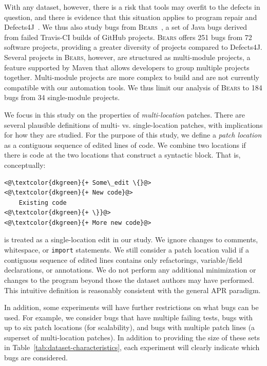 \documentclass[10pt,journal,compsoc]{IEEEtran}
\newcommand\bears{\textsc{Bears}\xspace}
\begin{document}
With any dataset, however, there is a risk that tools may overfit
to the defects in question, and there is evidence that this situation applies to
program repair and Defects4J~\cite{durieux-repair-them-all}. 
We thus also study bugs from \bears~\cite{bears}, 
a set of Java bugs derived from failed Travis-CI builds of GitHub projects. 
\bears offers 251 bugs from 72 software projects, providing a greater diversity of 
projects compared to Defects4J. 
Several projects in \bears, however, are structured as multi-module projects, a feature 
supported by Maven that allows developers to group multiple projects together. Multi-module 
projects are more complex to build and are not currently compatible with our automation tools.
We thus limit our analysis of \bears to 184 bugs from 34 single-module projects.

We focus in this study on the properties of \emph{multi-location} patches. There are
several plausible definitions of multi- vs. single-location patches, with
implications for how they are studied. For the purpose of this study, we define
a \emph{patch location} as a contiguous sequence of edited lines of code.  We
combine two locations if there is code at the two locations that construct a syntactic 
block. That is, conceptually:
\begin{lstlisting}[style=examplestyle]
<@\textcolor{dkgreen}{+ Some\_edit \{}@>
<@\textcolor{dkgreen}{+ New code}@>
    Existing code
<@\textcolor{dkgreen}{+ \}}@>
<@\textcolor{dkgreen}{+ More new code}@>
\end{lstlisting}
is treated as a single-location edit in our study. We ignore changes to
comments, whitespace, or \texttt{import} statements.
We still consider a patch location valid if a contiguous sequence of edited lines contains 
only refactorings, variable/field declarations, or annotations. We do not perform any 
additional minimization or changes to the program beyond those the dataset authors may 
have performed.
This intuitive definition is reasonably consistent with the general APR
paradigm. 

In addition, some experiments will have further restrictions on what bugs can be
used. For example, we consider bugs that have multiple failing tests, bugs with up to six patch 
locations (for scalability), and bugs with multiple patch lines (a superset of multi-location 
patches). In addition to providing the size of these sets in 
Table~\ref{tab:dataset-characteristics}, each experiment will clearly indicate
which bugs are considered. 
\end{document}
